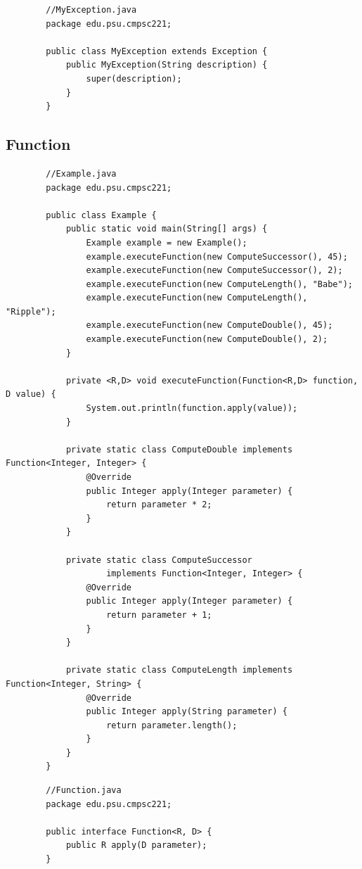 \documentclass[a4paper, 11pt]{article}
\begin{document}
        \begin{lstlisting}
        //MyException.java
        package edu.psu.cmpsc221;

        public class MyException extends Exception {
            public MyException(String description) {
                super(description);
            }
        }
        \end{lstlisting}

    \newpage

    \subsection{Function}
        \begin{lstlisting}
        //Example.java
        package edu.psu.cmpsc221;

        public class Example {
            public static void main(String[] args) {
                Example example = new Example();
                example.executeFunction(new ComputeSuccessor(), 45);
                example.executeFunction(new ComputeSuccessor(), 2);
                example.executeFunction(new ComputeLength(), "Babe");
                example.executeFunction(new ComputeLength(), "Ripple");
                example.executeFunction(new ComputeDouble(), 45);
                example.executeFunction(new ComputeDouble(), 2);
            }

            private <R,D> void executeFunction(Function<R,D> function, D value) {
                System.out.println(function.apply(value));
            }

            private static class ComputeDouble implements Function<Integer, Integer> {
                @Override
                public Integer apply(Integer parameter) {
                    return parameter * 2;
                }
            }

            private static class ComputeSuccessor
                    implements Function<Integer, Integer> {
                @Override
                public Integer apply(Integer parameter) {
                    return parameter + 1;
                }
            }

            private static class ComputeLength implements Function<Integer, String> {
                @Override
                public Integer apply(String parameter) {
                    return parameter.length();
                }
            }
        }
        \end{lstlisting}

        \begin{lstlisting}
        //Function.java
        package edu.psu.cmpsc221;

        public interface Function<R, D> {
            public R apply(D parameter);
        }
        \end{lstlisting}
\end{document}
